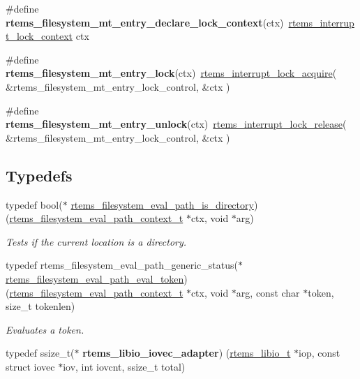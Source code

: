\begin{DoxyCompactItemize}
\#define {\bfseries rtems\+\_\+filesystem\+\_\+mt\+\_\+entry\+\_\+declare\+\_\+lock\+\_\+context}(ctx)~\mbox{\hyperlink{group__ClassicINTRLocks_gab9d4b488f1537323799db7c1fa69b9aa}{rtems\+\_\+interrupt\+\_\+lock\+\_\+context}} ctx
\item 
\mbox{\label{group__LibIOInternal_ga5e8ba7fa15b65f99fe452ce779c05f72}} 
\#define {\bfseries rtems\+\_\+filesystem\+\_\+mt\+\_\+entry\+\_\+lock}(ctx)~\mbox{\hyperlink{group__ClassicINTRLocks_ga0eeb7f40f9ac9e9c7b092d5fd85b5b3c}{rtems\+\_\+interrupt\+\_\+lock\+\_\+acquire}}( \&rtems\+\_\+filesystem\+\_\+mt\+\_\+entry\+\_\+lock\+\_\+control, \&ctx )
\item 
\mbox{\label{group__LibIOInternal_gae84f3481884a04bd20f4b1bc4338fc63}} 
\#define {\bfseries rtems\+\_\+filesystem\+\_\+mt\+\_\+entry\+\_\+unlock}(ctx)~\mbox{\hyperlink{group__ClassicINTRLocks_gaefc0c78feded09af9fd5b3ed93262f97}{rtems\+\_\+interrupt\+\_\+lock\+\_\+release}}( \&rtems\+\_\+filesystem\+\_\+mt\+\_\+entry\+\_\+lock\+\_\+control, \&ctx )
\end{DoxyCompactItemize}
\subsection*{Typedefs}
\begin{DoxyCompactItemize}
\item 
typedef bool($\ast$ \mbox{\hyperlink{group__LibIOInternal_ga163c6e729278f5dd69c324f462ef4e59}{rtems\+\_\+filesystem\+\_\+eval\+\_\+path\+\_\+is\+\_\+directory}}) (\mbox{\hyperlink{structrtems__filesystem__eval__path__context__t}{rtems\+\_\+filesystem\+\_\+eval\+\_\+path\+\_\+context\+\_\+t}} $\ast$ctx, void $\ast$arg)
\begin{DoxyCompactList}\small\item\em Tests if the current location is a directory. \end{DoxyCompactList}\item 
typedef rtems\+\_\+filesystem\+\_\+eval\+\_\+path\+\_\+generic\+\_\+status($\ast$ \mbox{\hyperlink{group__LibIOInternal_gae436fc8f66ede6cf15f46c38ea8958b0}{rtems\+\_\+filesystem\+\_\+eval\+\_\+path\+\_\+eval\+\_\+token}}) (\mbox{\hyperlink{structrtems__filesystem__eval__path__context__t}{rtems\+\_\+filesystem\+\_\+eval\+\_\+path\+\_\+context\+\_\+t}} $\ast$ctx, void $\ast$arg, const char $\ast$token, size\+\_\+t tokenlen)
\begin{DoxyCompactList}\small\item\em Evaluates a token. \end{DoxyCompactList}\item 
\mbox{\label{group__LibIOInternal_ga7a7bae5d49557042b3e1aa8e18d4e2fd}} 
typedef ssize\+\_\+t($\ast$ {\bfseries rtems\+\_\+libio\+\_\+iovec\+\_\+adapter}) (\mbox{\hyperlink{structrtems__libio__tt}{rtems\+\_\+libio\+\_\+t}} $\ast$iop, const struct iovec $\ast$iov, int iovcnt, ssize\+\_\+t total)
\end{DoxyCompactItemize}
